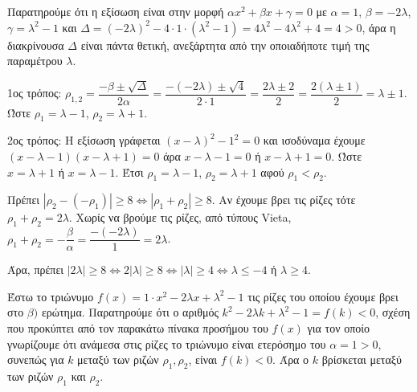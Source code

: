
\begin{alist}
\item Παρατηρούμε ότι η εξίσωση είναι στην μορφή $\alpha x^2 + \beta x + \gamma = 0$ με
$\alpha = 1$, $\beta = -2\lambda$, $\gamma = \lambda^2 - 1$ και
$\Delta = (-2\lambda)^2 - 4 \cdot 1 \cdot (\lambda^2 - 1) = 4\lambda^2 - 4\lambda^2 + 4 = 4 > 0$, άρα η διακρίνουσα $\Delta$ είναι πάντα
θετική, ανεξάρτητα από την οποιαδήποτε τιμή της παραμέτρου $\lambda$.

\item 
1ος τρόπος:
$\rho_{1,2} = \dfrac{-\beta \pm \sqrt{\Delta}}{2\alpha} = \dfrac{-(-2\lambda) \pm \sqrt{4}}{2 \cdot 1} = \dfrac{2\lambda \pm 2}{2} = \dfrac{2(\lambda \pm 1)}{2} = \lambda \pm 1$. Ώστε $\rho_1 = \lambda - 1$, $\rho_2 = \lambda + 1$.

2ος τρόπος:
Η εξίσωση γράφεται $(x - \lambda)^2 - 1^2 = 0$ και ισοδύναμα έχουμε
$(x - \lambda - 1)(x - \lambda + 1) = 0$ άρα
$x - \lambda - 1 = 0$ ή $x - \lambda + 1 = 0$. Ώστε $x = \lambda + 1$ ή $x = \lambda - 1$.
Έτσι $\rho_1 = \lambda - 1$, $\rho_2 = \lambda + 1$ αφού $\rho_1 < \rho_2$.

\item Πρέπει $|\rho_2 - (-\rho_1)| \ge 8 \Leftrightarrow |\rho_1 + \rho_2| \ge 8$. Αν έχουμε βρει τις ρίζες τότε $\rho_1 + \rho_2 = 2\lambda$.
Χωρίς να βρούμε τις ρίζες, από τύπους Vieta, $\rho_1 + \rho_2 = -\dfrac{\beta}{\alpha} = \dfrac{-(-2\lambda)}{1} = 2\lambda$.

Άρα, πρέπει $|2\lambda| \ge 8 \Leftrightarrow 2|\lambda| \ge 8 \Leftrightarrow |\lambda| \ge 4 \Leftrightarrow \lambda \le -4$ ή $\lambda \ge 4$.

\item Έστω το τριώνυμο $f(x) = 1 \cdot x^2 - 2\lambda x + \lambda^2 - 1$ τις ρίζες του οποίου έχουμε βρει στο $\beta)$ ερώτημα.
Παρατηρούμε ότι ο αριθμός $k^2 - 2\lambda k + \lambda^2 - 1 = f(k) < 0$, σχέση που προκύπτει από τον
παρακάτω πίνακα προσήμου του $f(x)$ για τον οποίο γνωρίζουμε ότι ανάμεσα στις ρίζες το τριώνυμο είναι ετερόσημο του $\alpha = 1 > 0$, συνεπώς για $k$ μεταξύ των ριζών $\rho_1, \rho_2$, είναι $f(k) < 0$.
Άρα ο $k$ βρίσκεται μεταξύ των ριζών $\rho_1$ και $\rho_2$.
\end{alist}


